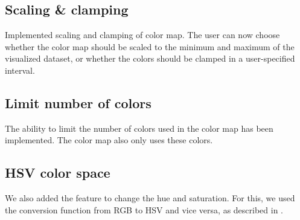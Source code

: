 	\subsection*{Scaling \& clamping}
		Implemented scaling and clamping of color map.
		The user can now choose whether the color map should be scaled to the minimum and maximum of the visualized dataset, or whether the colors should be clamped in a user-specified interval.
	\subsection*{Limit number of colors}
		The ability to limit the number of colors used in the color map has been implemented.
		The color map also only uses these colors.
	\subsection*{HSV color space}
		We also added the feature to change the hue and saturation.
		For this, we used the conversion function from RGB to HSV and vice versa, as described in \cite{telea2014data}.